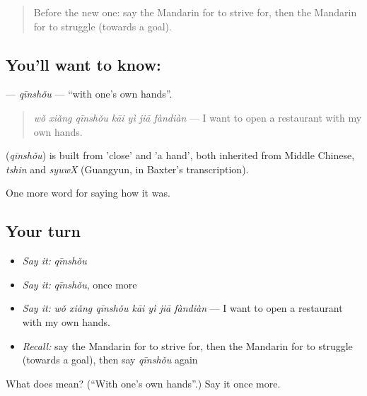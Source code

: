 \label{lesson:ZH-C513-qinshou}



\begin{quote}
Before the new one: say the Mandarin for to strive for, then the Mandarin for to struggle (towards a goal).
\end{quote}

\subsection*{You'll want to know: }
\textbf{} — \emph{qīnshǒu} — \textquotedblleft{}with one's own hands\textquotedblright{}.

\begin{quote}
\textbf{} \emph{wǒ xiǎng qīnshǒu kāi yì jiā fàndiàn} — I want to open a restaurant with my own hands.
\end{quote}

\begin{cousinweb}
\textbf{} (\emph{qīnshǒu}) is built from  'close' and  'a hand', both inherited from Middle Chinese, \emph{tshin} and \emph{syuwX} (Guangyun, in Baxter's transcription).
\end{cousinweb}

\begin{grammarlens}[title={What you've built}]
One more word for saying how it was.
\end{grammarlens}

\subsection*{Your turn}
\begin{itemize}
\raggedright
  \item \emph{Say it:} \emph{qīnshǒu}
  \item \emph{Say it:} \emph{qīnshǒu}, once more
  \item \emph{Say it:} \emph{wǒ xiǎng qīnshǒu kāi yì jiā fàndiàn} — I want to open a restaurant with my own hands.
  \item \emph{Recall:} say the Mandarin for to strive for, then the Mandarin for to struggle (towards a goal), then say \emph{qīnshǒu} again
\end{itemize}

\begin{tcolorbox}[breakable,colback=teal!4,colframe=teal!35!black,title={Before you move on}]
What does  mean? (\textquotedblleft{}With one's own hands\textquotedblright{}.) Say it once more.
\end{tcolorbox}
